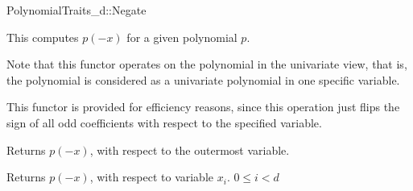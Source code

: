 \begin{ccRefConcept}{PolynomialTraits_d::Negate}
\ccDefinition

This  computes $p(-x)$ for a given polynomial $p$. 

Note that this functor operates on the polynomial in the univariate view, that is, 
the polynomial is considered as a univariate polynomial in one specific variable. 

This functor is provided for efficiency reasons, since this operation just flips the sign 
of all odd coefficients with respect to the specified variable.  

\ccRefines 
{}

\ccTypes
{}
\ccGlue
{}

\ccOperations
{}
         { Returns $p(-x)$, with respect to the outermost variable. }

         { Returns $p(-x)$, with respect to variable $x_i$. 
           \ccPrecond $0 \leq i  < d$
         }


\ccSeeAlso

\\
\\

\end{ccRefConcept}
